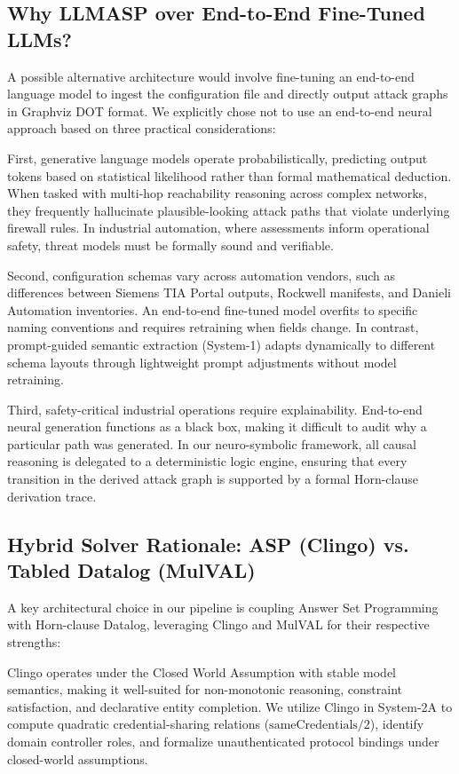 \documentclass[target=mst,aauheader=aics,style=]{thud}
\begin{document}
\subsection{Why LLMASP over End-to-End Fine-Tuned LLMs?}
A possible alternative architecture would involve fine-tuning an end-to-end language model to ingest the configuration file and directly output attack graphs in Graphviz DOT format. We explicitly chose not to use an end-to-end neural approach based on three practical considerations:

First, generative language models operate probabilistically, predicting output tokens based on statistical likelihood rather than formal mathematical deduction. When tasked with multi-hop reachability reasoning across complex networks, they frequently hallucinate plausible-looking attack paths that violate underlying firewall rules. In industrial automation, where assessments inform operational safety, threat models must be formally sound and verifiable.

Second, configuration schemas vary across automation vendors, such as differences between Siemens TIA Portal outputs, Rockwell manifests, and Danieli Automation inventories. An end-to-end fine-tuned model overfits to specific naming conventions and requires retraining when fields change. In contrast, prompt-guided semantic extraction (System-1) adapts dynamically to different schema layouts through lightweight prompt adjustments without model retraining.

Third, safety-critical industrial operations require explainability. End-to-end neural generation functions as a black box, making it difficult to audit why a particular path was generated. In our neuro-symbolic framework, all causal reasoning is delegated to a deterministic logic engine, ensuring that every transition in the derived attack graph is supported by a formal Horn-clause derivation trace.

\subsection{Hybrid Solver Rationale: ASP (Clingo) vs. Tabled Datalog (MulVAL)}
A key architectural choice in our pipeline is coupling Answer Set Programming with Horn-clause Datalog, leveraging Clingo and MulVAL for their respective strengths:

Clingo operates under the Closed World Assumption with stable model semantics, making it well-suited for non-monotonic reasoning, constraint satisfaction, and declarative entity completion. We utilize Clingo in System-2A to compute quadratic credential-sharing relations ($\text{sameCredentials}/2$), identify domain controller roles, and formalize unauthenticated protocol bindings under closed-world assumptions.
\end{document}
